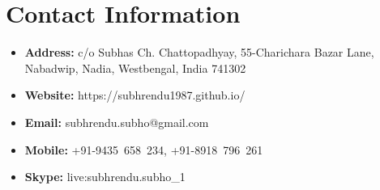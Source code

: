 \documentclass{article}
\begin{document}
 
\begin{center}
	\Large{\bf \name}
\end{center}
%                                  

 \noindent\makebox[\linewidth]{\rule{\textwidth}{0.4pt}}
\section{Contact Information}
	\begin{itemize}
		\item {\bf Address:} c/o Subhas Ch. Chattopadhyay, 55-Charichara Bazar Lane, Nabadwip, Nadia, Westbengal, India 741302
		\item {\bf Website:} https://subhrendu1987.github.io/
		\item {\bf Email:} subhrendu.subho@gmail.com
		\item {\bf Mobile:} +91-9435~658~234, +91-8918~796~261
		\item {\bf Skype:} live:subhrendu.subho\_1
	\end{itemize}
\end{document}
